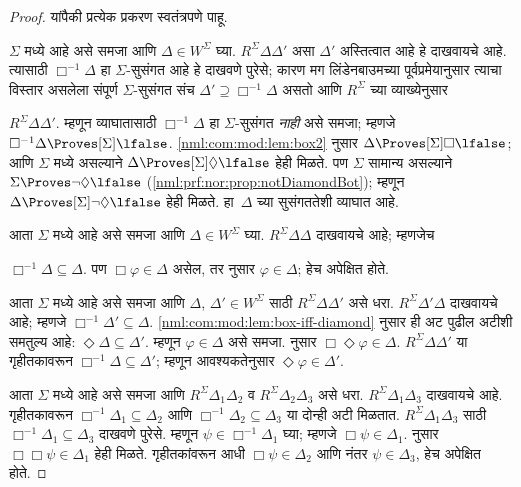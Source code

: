\begin{proof}
  यांपैकी प्रत्येक प्रकरण स्वतंत्रपणे पाहू.

  $\Sigma$ मध्ये  आहे असे समजा आणि
  $\Delta \in W^\Sigma$ घ्या.
  $R^\Sigma \Delta\Delta'$ असा
  $\Delta'$ अस्तित्वात आहे हे दाखवायचे आहे.
  त्यासाठी $\Box^{-1}\Delta$ हा
  $\Sigma$-सुसंगत आहे हे दाखवणे पुरेसे;
  कारण मग लिंडेनबाउमच्या पूर्वप्रमेयानुसार
  त्याचा विस्तार असलेला संपूर्ण
  $\Sigma$-सुसंगत संच
  $\Delta' \supseteq \Box^{-1}\Delta$
  असतो आणि $R^\Sigma$ च्या व्याख्येनुसार

  $R^\Sigma \Delta\Delta'$.
  म्हणून व्याघातासाठी $\Box^{-1}\Delta$
  हा $\Sigma$-सुसंगत \emph{नाही}
  असे समजा; म्हणजे
  $\Box^{-1}\Delta \Proves[\Sigma] \lfalse$.
  \ref{nml:com:mod:lem:box2} नुसार
  $\Delta \Proves[\Sigma] \Box\lfalse$;
  आणि $\Sigma$ मध्ये  असल्याने
  $\Delta \Proves[\Sigma] \Diamond\lfalse$
  हेही मिळते. पण $\Sigma$ सामान्य असल्याने
  $\Sigma \Proves \lnot\Diamond \lfalse$
  (\ref{nml:prf:nor:prop:notDiamondBot});
  म्हणून $\Delta
  \Proves[\Sigma] \lnot\Diamond \lfalse$
  हेही मिळते. हा~$\Delta$ च्या
  सुसंगततेशी व्याघात आहे.

  आता $\Sigma$ मध्ये  आहे
  असे समजा आणि $\Delta \in W^\Sigma$
  घ्या. $R^\Sigma \Delta\Delta$
  दाखवायचे आहे; म्हणजेच

  $\Box^{-1}\Delta \subseteq \Delta$.
  पण $\Box\varphi \in \Delta$ असेल,
  तर  नुसार $\varphi \in \Delta$;
  हेच अपेक्षित होते.

  आता $\Sigma$ मध्ये  आहे
  असे समजा आणि $\Delta$, $\Delta' \in
  W^\Sigma$ साठी $R^\Sigma
  \Delta\Delta'$ असे धरा.
  $R^\Sigma \Delta'\Delta$
  दाखवायचे आहे; म्हणजे
  $\Box^{-1}\Delta'
    \subseteq \Delta$.
    \ref{nml:com:mod:lem:box-iff-diamond} नुसार
    ही अट पुढील अटीशी समतुल्य आहे:
  $\Diamond\Delta \subseteq \Delta'$.
  म्हणून $\varphi \in \Delta$ असे
  समजा.  नुसार
  $\Box\Diamond\varphi \in \Delta$.
  $R^\Sigma \Delta\Delta'$ या
  गृहीतकावरून
  $\Box^{-1}\Delta \subseteq \Delta'$;
  म्हणून आवश्यकतेनुसार
  $\Diamond\varphi \in \Delta'$.

  आता $\Sigma$ मध्ये  आहे असे
  समजा आणि $R^\Sigma \Delta_1\Delta_2$
  व $R^\Sigma \Delta_2\Delta_3$
  असे धरा. $R^\Sigma
  \Delta_1\Delta_3$ दाखवायचे आहे.
  गृहीतकावरून
  $\Box^{-1}\Delta_1 \subseteq \Delta_2$
  आणि $\Box^{-1}\Delta_2 \subseteq \Delta_3$
  या दोन्ही अटी मिळतात.
  $R^\Sigma \Delta_1\Delta_3$
  साठी $\Box^{-1}\Delta_1
  \subseteq \Delta_3$ दाखवणे पुरेसे.
  म्हणून $\psi \in \Box^{-1}\Delta_1$
  घ्या; म्हणजे $\Box\psi \in \Delta_1$.
   नुसार $\Box\Box\psi \in
  \Delta_1$ हेही मिळते. गृहीतकांवरून
  आधी $\Box\psi \in \Delta_2$
  आणि नंतर $\psi \in \Delta_3$,
  हेच अपेक्षित होते.


\end{proof}
